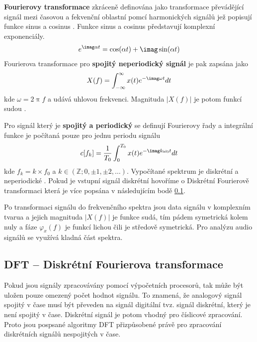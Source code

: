   \textbf{Fourierovy transformace} zkráceně definována jako transformace převádějící signál mezi časovou a fekvenční oblastní pomcí harmonických signálů jež popisují funkce sinus a cosinus \cite{bracewell1978fourier}. Funkce sinus a cosinus představují komplexní exponenciály.
  \begin{equation}
    e^{\imag \alpha t} = \cos(\alpha t) + \imag \sin(\alpha t)
  \end{equation}
  Fourierova transformace pro \textbf{ spojitý neperiodický signál} je pak zapsána jako
  \begin{equation}
    X(f) = \int_{-\infty}^{\infty} x(t) e^{-\imag\omega t} dt
  \end{equation}
  kde $\omega = 2\uppi f$ a udává uhlovou frekvenci. Magnituda $|X(f)|$ je potom funkcí sudou \cite{sneddon1995fourier}.

  Pro signál který je \textbf{spojitý a periodický} se definují Fourierovy řady a integrální funkce je počítaná pouze pro jednu periodu signálu
  \begin{equation}
    c[f_k] = \frac{1}{T_0} \int_{0}^{T_0} x(t) e^{-\imag k \omega_0 t} dt
  \end{equation}
  kde $f_k = k \times f_0$ a $k \in (\mathbb{Z}; 0, \pm 1, \pm 2, \dots)$. Vypočítané spektrum je diskrétní a neperiodické \cite{sneddon1995fourier}. Pokud je vstupní signál diskrétní hovoříme o Diskrétní Fourierově transformaci která je více popsána v následujícím bodě \ref{sec:DFT}.

 Po transformaci signálu do frekvenčního spektra jsou data signálu v komplexním tvarua a jejich magnituda $|X(f)|$ je funkce sudá, tím pádem symetrická kolem nuly a fáze $\varphi_x(f)$ je funkcí lichou čili je středově symetrická. Pro analýzu audio signálů se využívá kladná část spektra.

  \subsection{DFT -- Diskrétní Fourierova transformace} \label{sec:DFT}

  Pokud jsou signály zpracovávány pomocí výpočetních procesorů,
  tak může být uložen pouze omezený počet hodnot signálu.
  To znamená, že analogový signál spojitý v čase musí být převeden na signál digitální tvz. signál diskrétní, který je není spojitý v čase. 
  Diskrétní signál je potom vhodný pro číslicové zpracování.
  Proto jsou pospsané algoritmy \acs{DFT} přizpůsobené právě pro zpracování diskrétních signálů nespojitých v čase.

